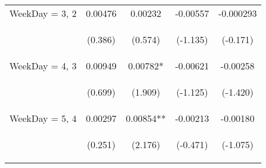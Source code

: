 \documentclass[]{standalone}
\begin{document}
\begin{tabular}{lcccc}
    WeekDay = 3, 2   & 0.00476                                        & 0.00232                                        & -0.00557                                       & -0.000293                                      \\
    \vspace{4pt}     & \begin{footnotesize}(0.386)\end{footnotesize}  & \begin{footnotesize}(0.574)\end{footnotesize}  & \begin{footnotesize}(-1.135)\end{footnotesize} & \begin{footnotesize}(-0.171)\end{footnotesize} \\
    WeekDay = 4, 3   & 0.00949                                        & 0.00782*                                       & -0.00621                                       & -0.00258                                       \\
    \vspace{4pt}     & \begin{footnotesize}(0.699)\end{footnotesize}  & \begin{footnotesize}(1.909)\end{footnotesize}  & \begin{footnotesize}(-1.125)\end{footnotesize} & \begin{footnotesize}(-1.420)\end{footnotesize} \\
    WeekDay = 5, 4   & 0.00297                                        & 0.00854**                                      & -0.00213                                       & -0.00180                                       \\
    \vspace{4pt}     & \begin{footnotesize}(0.251)\end{footnotesize}  & \begin{footnotesize}(2.176)\end{footnotesize}  & \begin{footnotesize}(-0.471)\end{footnotesize} & \begin{footnotesize}(-1.075)\end{footnotesize} \\

\end{tabular}
\end{document}
